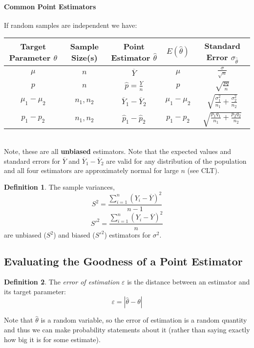\documentclass[12 pt]{article}
\theoremstyle{definition}
\newtheorem{defn}{Definition}
\begin{document}
    \paragraph{Common Point Estimators} If random samples are
    independent we have:
    \\
    \begin{tabular}{|c c c c c|}
      \hline Target Parameter $\theta$ & Sample Size(s) & Point
      Estimator $\hat{\theta}$ & $E(\hat{\theta})$ & Standard Error
      $\sigma_{\hat{\theta}}$
      \\ \hline $\mu$ & $n$ & $\overline{Y}$ & $\mu$ &
      $\frac{\sigma}{\sqrt{n}}$
      \\ $p$ & $n$ & $\hat{p} = \frac{Y}{n}$ & $p$ &
      $\sqrt{\frac{pq}{n}}$
      \\ $\mu_1 - \mu_2$ & $n_1, n_2$ & $\overline{Y}_1 -
      \overline{Y}_2$ & $\mu_1 - \mu_2$ &
      $\sqrt{\frac{\sigma_1^2}{n_1}+ \frac{\sigma_2^2}{n_2}}$
      \\ $p_1 - p_2$ & $n_1,n_2$ & $\hat{p}_1 - \hat{p}_2$ & $p_1 -
      p_2$ & $\sqrt{\frac{p_1q_1}{n_1}+\frac{p_2q_2}{n_2}}$
      \\ \hline
    \end{tabular}\\
    Note, these are all \textbf{unbiased} estimators. Note that the expected
    values and standard errors for $\overline{Y}$ and $\overline{Y}_1
    - \overline{Y}_2$ are valid for any distribution of the population
    and all four estimators are approximately normal for large $n$
    (see CLT).
    \begin{defn}
      The sample variances,
      $$S^2 = \dfrac{\sum_{i=1}^n (Y_i - \overline{Y})^2}{n-1}$$
      $$S'^2 = \dfrac{\sum_{i=1}^n (Y_i - \overline{Y})^2}{n}$$
      are unbiased ($S^2$) and biased ($S'^2$) estimators for $\sigma^2$.
    \end{defn}
    \subsection{Evaluating the Goodness of a Point Estimator}
    \begin{defn}
      The \textit{error of estimation} $\varepsilon$ is the distance
      between an estimator and its target parameter:
      $$\varepsilon = |\hat{\theta} - \theta|$$
    \end{defn}
    Note that $\hat{\theta}$ is a random variable, so the error of
    estimation is a random quantity and thus we can make probability
    statements about it (rather than saying exactly how big it is for
    some estimate).
\end{document}
